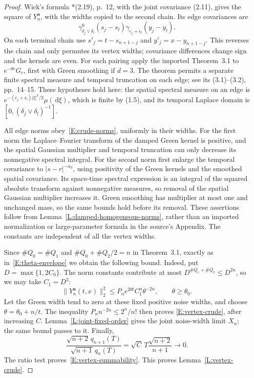 \documentclass[12pt]{article}
\numberwithin{equation}{section}
\theoremstyle{definition}
\newcommand{\ud}{\,\mathrm{d}}
\begin{document}
\begin{proof}
  Wick's formula \cite{chen:author2026:time-dependency}*{(2.19), p.~12},
  with the joint covariance (2.11), gives the square of
  $Y_n^{\boldsymbol a}$, with the widths copied to the second chain. Its edge
  covariances are
  \[
    \gamma^0_{\delta_j\vee\delta_l}(s_j-s_l)
    \gamma_{\epsilon_j+\epsilon_l}(y_j-y_l).
  \]
  On each terminal chain use
  $s'_j=t-s_{n+1-j}$ and $y'_j=x-y_{n+1-j}$.
  This reverses the chain and only permutes its vertex widths;
  covariance differences change sign and the kernels are even.
  For each pairing apply the imported Theorem~3.1 to
  $e^{-\theta r}G_r$, first with Green smoothing if
  $d=3$. The theorem permits a separate finite spectral measure and
  temporal truncation on each edge; see its (3.1)--(3.2), pp.~14--15.
  These hypotheses hold here: the spatial spectral measure on an edge
  is $e^{-(\epsilon_j+\epsilon_l)|\xi|^2/2}\mu(\ud\xi)$, which is
  finite by (1.5), and its temporal Laplace domain is
  $[0,(\delta_j\vee\delta_l)^{-1}]$.

  All edge norms obey~\eqref{E:crude-norms}, uniformly in their widths.
  For the first norm the Laplace--Fourier transform of the damped Green
  kernel is positive, and the spatial Gaussian multiplier and temporal
  truncation can only decrease its nonnegative spectral integral.
  For the second norm first enlarge the temporal covariance to
  $|s-r|^{-\alpha_0}$, using positivity of the Green kernels and the
  smoothed spatial covariance. Its space-time spectral expression is
  an integral of the squared absolute transform against nonnegative
  measures, so removal of the spatial Gaussian multiplier increases it.
  Green smoothing has multiplier at most one and unchanged mass,
  so the same bounds hold before its removal. These assertions follow
  from Lemma~\ref{L:damped-homogeneous-norms}, rather than an imported
  normalization or large-parameter formula in the source's Appendix.
  The constants are independent of all the vertex widths.

  Since $\#Q_0=\#Q_1$ and $\#Q_0+\#Q_2/2=n$ in Theorem~3.1,
  exactly as in~\eqref{E:theta-envelope} we obtain the following bound.
  Indeed, put $D=\max\{1,2C_0\}$. The norm constants contribute at
  most $D^{\#Q_1+\#Q_2}\le D^{2n}$, so we may take $C_1=D^2$:
  \[
    \|Y_n^{\boldsymbol a}(t,x)\|_2^2
    \le P_n e^{2\theta t}C_1^n\theta^{-2n},\qquad\theta\ge\theta_0.
  \]
  Let the Green width tend to zero at these fixed positive noise
  widths, and choose $\theta=\theta_0+n/t$.
  The inequality $P_n n^{-2n}\le2^n/n!$ then proves
  \eqref{E:vertex-crude}, after increasing $C$.
  Lemma~\ref{L:joint-fixed-order} gives the joint noise-width limit $X_n$;
  the same bound passes to it. Finally,
  \[
    \frac{\sqrt{n+2}\,q_{n+1}(T)}
    {\sqrt{n+1}\,q_n(T)}
    =\sqrt C\,T\frac{\sqrt{n+2}}{n+1}\longrightarrow0.
  \]
  The ratio test proves~\eqref{E:vertex-summability}.
  This proves Lemma~\ref{L:vertex-crude}.
\end{proof}
\end{document}

